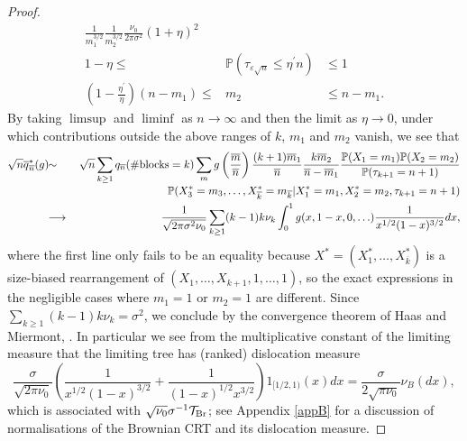 \documentclass[11pt,a4paper]{article}
\newcommand{\bP}{\mathbb{P}}
\newcommand{\cT}{\mathcal{T}}
\begin{document}
\begin{proof}
\begin{eqnarray*}
\frac{1}{m_1^{3/2}}\frac{1}{m_2^{3/2}}\frac{\nu_0}{2\pi\sigma^2}(1+\eta)^2\\
1-\eta\le&\bP(\tau_{\varepsilon\sqrt{n}}\le\eta^\prime n)&\le 1\\[-0.1cm]
\left(1-\frac{\eta^\prime}{\eta}\right)(n-m_1)\le &m_2&\le n-m_1.
\end{eqnarray*}
By taking $\limsup$ and $\liminf$ as $n\rightarrow\infty$ and then the limit as $\eta\rightarrow 0$, under which contributions outside the above ranges of $k$, $m_1$ and $m_2$ vanish, we see that
\begin{eqnarray*}\sqrt{n}\overline{q}_{\overline{n}}^*(g)
&\!\!\sim\!\!&
\sqrt{n}\sum_{k\ge 1}q_{\overline{n}}(\#{\rm blocks}=k)
\sum_m g\left(\frac{\overline{m}}{\overline{n}}\right)
\frac{(k+1)\overline{m}_1}{\overline{n}}\frac{k\overline{m}_2}{\overline{n}-\overline{m}_1}
\frac{\bP(X_1=m_1)\bP(X_2=m_2)}{\bP(\tau_{k+1}=n+1)}\\[-0.1cm]
&&\hspace{3cm}\bP(X_3^*=m_3,\ldots,X_{\overline{k}}^*=m_{\overline{k}}|X_1^*=m_1,X_2^*=m_2,\tau_{k+1}=n+1)
\\
&\!\!\longrightarrow\!\!&\frac{1}{\sqrt{2\pi\sigma^2\nu_0}}\sum_{k\ge 1}(k-1)k\nu_k\int_0^1g(x,1-x,0,\ldots)\frac{1}{x^{1/2}(1-x)^{3/2}}dx,
\end{eqnarray*}
where the first line only fails to be an equality because $X^*=(X_1^*,\ldots,X_{\overline{k}}^*)$ is a size-biased rearrangement of $(X_1,\ldots,X_{k+1},1,\ldots,1)$, so the exact expressions in the negligible cases where $m_1=1$ or $m_2=1$ are different. Since $\sum_{k\ge 1}(k-1)k\nu_k=\sigma^2$, we conclude by the convergence theorem of Haas and Miermont, \cite[Theorem 1]{HM10}. In particular we see from the multiplicative constant of the limiting measure that the limiting tree has
(ranked) dislocation measure 
$$\frac{\sigma}{\sqrt{2\pi\nu_0}}\left(\frac{1}{x^{1/2}(1-x)^{3/2}}+\frac{1}{(1-x)^{1/2}x^{3/2}}\right)1_{[1/2,1)}(x)dx=\frac{\sigma}{2\sqrt{\pi\nu_0}}\nu_B(dx),$$
which is associated with $\sqrt{\nu_0}\sigma^{-1}\cT_{\rm Br}$; see Appendix \ref{appB} for a discussion of normalisations of the Brownian CRT and its dislocation measure. 
\end{proof}
\end{document}
